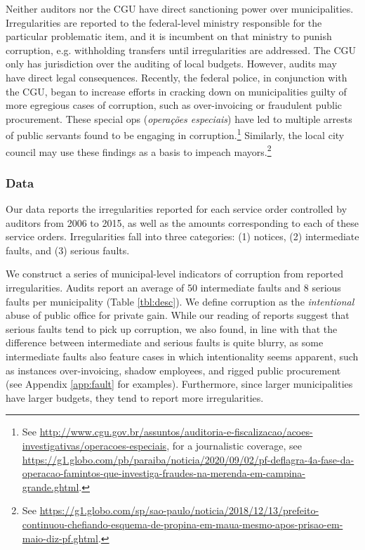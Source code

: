 Neither auditors nor the CGU have direct sanctioning power over municipalities. Irregularities are reported to the federal-level ministry responsible for the particular problematic item, and it is incumbent on that ministry to punish corruption, e.g. withholding transfers until irregularities are addressed. The CGU only has jurisdiction over the auditing of local budgets. However, audits may have direct legal consequences. Recently, the federal police, in conjunction with the CGU, began to increase efforts in cracking down on municipalities guilty of more egregious cases of corruption, such as over-invoicing or fraudulent public procurement. These special ops (\emph{operações especiais}) have led to multiple arrests of public servants found to be engaging in corruption.\footnote{See \url{http://www.cgu.gov.br/assuntos/auditoria-e-fiscalizacao/acoes-investigativas/operacoes-especiais}, for a journalistic coverage, see \url{https://g1.globo.com/pb/paraiba/noticia/2020/09/02/pf-deflagra-4a-fase-da-operacao-famintos-que-investiga-fraudes-na-merenda-em-campina-grande.ghtml}.} Similarly, the local city council may use these findings as a basis to impeach mayors.\footnote{See \url{https://g1.globo.com/sp/sao-paulo/noticia/2018/12/13/prefeito-continuou-chefiando-esquema-de-propina-em-maua-mesmo-apos-prisao-em-maio-diz-pf.ghtml}.}  %

\subsubsection*{Data}

Our data reports the irregularities reported for each service order controlled by auditors from 2006 to 2015, as well as the amounts corresponding to each of these service orders. Irregularities fall into three categories: (1) notices, (2) intermediate faults, and (3) serious faults. 

We construct a series of municipal-level indicators of corruption from reported irregularities. Audits report an average of 50 intermediate faults and 8 serious faults per municipality (Table \ref{tbl:desc}). We define corruption as the \emph{intentional} abuse of public office for private gain. While our reading of reports suggest that serious faults tend to pick up corruption, we also found, in line with \citet{avis_government_2018} that the difference between intermediate and serious faults is quite blurry, as some intermediate faults also feature cases in which intentionality seems apparent, such as instances over-invoicing, shadow employees, and rigged public procurement (see Appendix \ref{app:fault} for examples). Furthermore, since larger municipalities have larger budgets, they tend to report more irregularities. 

